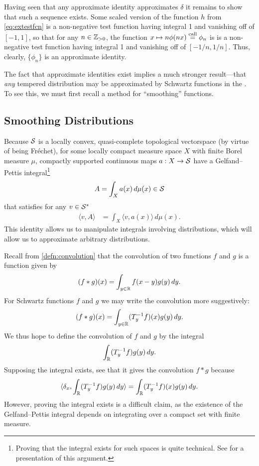     Having seen that any approximate identity approximates $\delta$ it remains to show that such a sequence exists.
    Some scaled version of the function $h$ from \cref{eq:extestfcn} is a non-negative test function having integral 1 and vanishing off of $[-1,1]$, so that for any $n\in\Z_{>0}$, the function $x\mapsto n\phi(nx) \call \phi_n$ is is a non-negative test function having integral 1 and vanishing off of $[-1/n,1/n]$.
    Thus, clearly, $\{\phi_n\}$ is an approximate identity.

    The fact that approximate identities exist implies a much stronger result---that \emph{any} tempered distribution may be approximated by Schwartz functions in the \ws.
    To see this, we must first recall a method for ``smoothing'' functions.

  \subsection{Smoothing Distributions}
  Because $\S$ is a locally convex, quasi-complete topological vectorspace (by virtue of being Fr\'echet), for some locally compact measure space $X$ with finite Borel measure $\mu$, compactly supported continuous maps $a:X\rightarrow\S$ have a Gelfand--Pettis integral\footnote{Proving that the \gp integral exists for such spaces is quite technical. See \citet{vvint} for a presentation of this argument.}
    \begin{align*}
      A = \int_X a(x)\,d\mu(x) \in\S
    \end{align*}
    that satisfies for any $v\in\SS$
    \begin{align*}
      \langle v, A\rangle
      &= \int_X \langle v, a(x)\rangle\,d\mu(x) \text{.}
    \end{align*}
    This identity allows us to manipulate integrals involving distributions, which will allow us to approximate arbitrary distributions.

    Recall from \cref{defn:convolution} that the convolution of two functions $f$ and $g$ is a function given by
    \begin{align*}
      (f*g)(x) = \int_{y\in\R} f(x-y)g(y)\,dy \text{.}
    \end{align*}
    For Schwartz functions $f$ and $g$ we may write the convolution more suggestively:
    \begin{align*}
      (f*g)(x) = \int_{y\in\R} (T_y\inv f)(x)g(y)\,dy \text{.}
    \end{align*}
    We thus hope to define the convolution of $f$ and $g$ by the \gp integral
    \begin{align*}
      \int_\R (T_y\inv f)g(y)\,dy \text{.}
    \end{align*}
    Supposing the integral exists, see that it gives the convolution $f*g$ because
    \begin{align*}
      \langle\delta_x, \int_\R (T_y\inv f)g(y)\,dy\rangle 
      = \int_\R (T_y\inv f)(x)g(y)\,dy \text{.}
    \end{align*}
    However, proving the integral exists is a difficult claim, as the existence of the Gelfand--Pettis integral depends on integrating over a compact set with finite measure.

